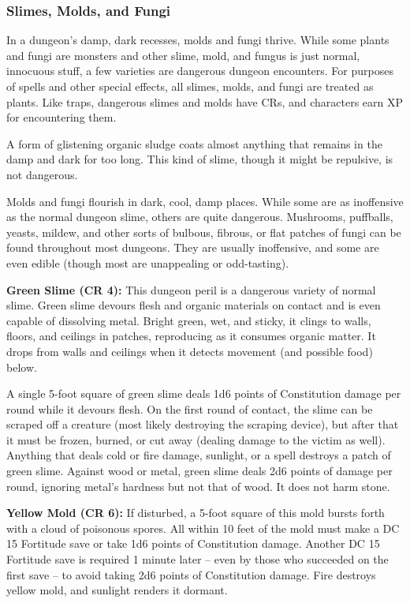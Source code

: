 \subsubsection{Slimes, Molds, and Fungi}

In a dungeon's damp, dark recesses, molds and fungi thrive. While some plants and 
fungi are monsters and other slime, mold, and fungus is just normal, innocuous 
stuff, a few varieties are dangerous dungeon encounters. For purposes of spells 
and other special effects, all slimes, molds, and fungi are treated as plants. 
Like traps, dangerous slimes and molds have CRs, and characters earn XP for encountering 
them.

A form of glistening organic sludge coats almost anything that remains in the damp 
and dark for too long. This kind of slime, though it might be repulsive, is not 
dangerous.

Molds and fungi flourish in dark, cool, damp places. While some are as inoffensive 
as the normal dungeon slime, others are quite dangerous. Mushrooms, puffballs, 
yeasts, mildew, and other sorts of bulbous, fibrous, or flat patches of fungi can 
be found throughout most dungeons. They are usually inoffensive, and some are even 
edible (though most are unappealing or odd-tasting).

\textbf{Green Slime (CR 4):} This dungeon peril is a dangerous variety of normal 
slime. Green slime devours flesh and organic materials on contact and is even capable 
of dissolving metal. Bright green, wet, and sticky, it clings to walls, floors, 
and ceilings in patches, reproducing as it consumes organic matter. It drops from 
walls and ceilings when it detects movement (and possible food) below.

A single 5-foot square of green slime deals 1d6 points of Constitution damage per 
round while it devours flesh. On the first round of contact, the slime can be scraped 
off a creature (most likely destroying the scraping device), but after that it 
must be frozen, burned, or cut away (dealing damage to the victim as well). Anything 
that deals cold or fire damage, sunlight, or a  spell destroys 
a patch of green slime. Against wood or metal, green slime deals 2d6 points of 
damage per round, ignoring metal's hardness but not that of wood. It does not harm 
stone.

\textbf{Yellow Mold (CR 6):} If disturbed, a 5-foot square of this mold bursts 
forth with a cloud of poisonous spores. All within 10 feet of the mold must make 
a DC 15 Fortitude save or take 1d6 points of Constitution damage. Another DC 15 
Fortitude save is required 1 minute later -- even by those who succeeded on the 
first save -- to avoid taking 2d6 points of Constitution damage. Fire destroys yellow 
mold, and sunlight renders it dormant.


